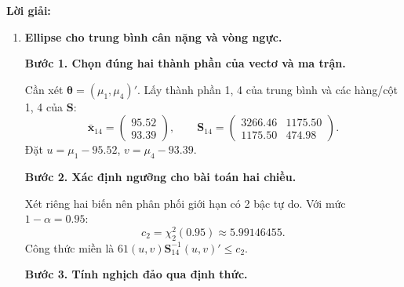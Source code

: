 \documentclass[11pt,a4paper]{article}
\renewcommand{\boldsymbol}[1]{\symbf{#1}}
\newenvironment{solution}{%
  \par\medskip\noindent\textbf{Lời giải:}\par\nobreak\smallskip\noindent\ignorespaces
}{\par}
\newcommand{\step}[2]{\par\medskip\noindent\textbf{Bước #1. #2}\par\nopagebreak[4]\smallskip\noindent}
\begin{document}
\begin{solution}
\begin{enumerate}[label=\textbf{\alph*)}]
\step{5}{Kết luận.}
Sáu khoảng $I_j=[L_j,U_j]$ ở bảng có độ bao phủ đồng thời xấp xỉ ít nhất
$95\%$ theo phương pháp mẫu lớn. Khoảng cho $\mu_1$ có đơn vị kg;
các khoảng còn lại có đơn vị cm.
\item \textbf{Ellipse cho trung bình cân nặng và vòng ngực.}\par\nopagebreak[4]
\step{1}{Chọn đúng hai thành phần của vectơ và ma trận.}
Cần xét $\boldsymbol{\theta}=(\mu_1,\mu_4)'$.
Lấy thành phần 1, 4 của trung bình và các hàng/cột 1, 4 của $\mathbf{S}$:
\[
\bar{\mathbf{x}}_{14}=\begin{pmatrix}95.52\\93.39\end{pmatrix},\qquad
\mathbf{S}_{14}=\begin{pmatrix}3266.46&1175.50\\1175.50&474.98\end{pmatrix}.
\]
Đặt $u=\mu_1-95.52$, $v=\mu_4-93.39$.
\step{2}{Xác định ngưỡng cho bài toán hai chiều.}
Xét riêng hai biến nên phân phối giới hạn có 2 bậc tự do.
Với mức $1-\alpha=0.95$:
\[
c_2=\chi_2^2(0.95)\approx5.99146455.
\]
Công thức miền là $61(u,v)\mathbf{S}_{14}^{-1}(u,v)'\le c_2$.
\step{3}{Tính nghịch đảo qua định thức.}


\end{enumerate}
\end{solution}
\end{document}
